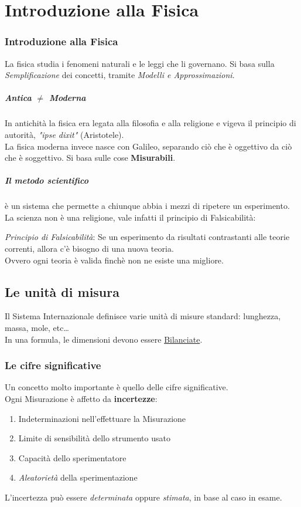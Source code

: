 \documentclass[12pt, a4paper, openany]{book}
\begin{document}
\chapter{Introduzione alla Fisica}

\subsection{Introduzione alla Fisica}
La fisica studia i fenomeni naturali e le leggi che li governano.
Si basa sulla \emph{Semplificazione} dei concetti, tramite \emph{Modelli e Approssimazioni}.


\paragraph{Antica $\neq$ Moderna} In antichità la fisica era legata alla filosofia e alla religione
e vigeva il principio di autorità, \emph{"ipse dixit"} (Aristotele).
\\La fisica moderna invece nasce con Galileo, separando ciò che è oggettivo da ciò che è soggettivo.
Si basa sulle cose \textbf{Misurabili}.
\paragraph{Il metodo scientifico} è un sistema che permette a chiunque abbia i mezzi di ripetere un esperimento.
La scienza non è una religione, vale infatti il principio di Falsicabilità:
\begin{center}
    \emph{Principio di Falsicabilità}: Se un esperimento da risultati contrastanti alle teorie correnti, allora c'è bisogno di una nuova teoria.
    \\Ovvero ogni teoria è valida finchè non ne esiste una migliore.
\end{center}
\section{Le unità di misura}
Il Sistema Internazionale definisce varie unità di misure standard: lunghezza, massa, mole, etc\dots
\\In una formula, le dimensioni devono essere \underline{Bilanciate}.
\subsection{Le cifre significative}
Un concetto molto importante è quello delle cifre significative.
\\Ogni Misurazione è affetto da \textbf{incertezze}:
\begin{enumerate}
    \item Indeterminazioni nell'effettuare la Misurazione
    \item Limite di sensibilità dello strumento usato
    \item Capacità dello sperimentatore
    \item \emph{Aleatorietà} della sperimentazione
\end{enumerate}
L'incertezza può essere \emph{determinata} oppure \emph{stimata}, in base al caso in esame.
\end{document}
